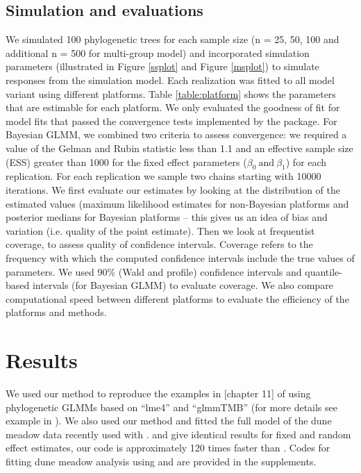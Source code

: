 \documentclass[12pt]{article}
\begin{document}
\subsection*{Simulation and evaluations}
We simulated 100 phylogenetic trees for each sample size (n = 25, 50, 100 and additional n = 500 for multi-group model) and incorporated simulation parameters (illustrated in Figure \ref{ssplot} and Figure \ref{msplot}) to simulate responses from the simulation model.
Each realization was fitted to all model variant using different platforms.
Table \ref{table:platform} shows the parameters that are estimable for each platform. 
We only evaluated the goodness of fit for model fits that passed the convergence tests implemented by the package.
For Bayesian GLMM, we combined two criteria to assess convergence: we required a value of the Gelman and Rubin statistic less than 1.1 and an effective sample size (ESS) greater than 1000 for the fixed effect parameters ($\beta_{0} \ \textrm{and} \ \beta_{1}$) for each replication. 
For each replication we sample two chains starting with 10000 iterations. 
We first evaluate our estimates by looking at the distribution of the estimated values (maximum likelihood estimates for non-Bayesian platforms and posterior medians for Bayesian platforms -- this gives us an idea of bias and variation (i.e. quality of the point estimate).
Then we look at frequentist coverage, to assess quality of confidence intervals.
Coverage refers to the frequency with which the computed confidence intervals include the true values of parameters.
We used 90\% (Wald and profile) confidence intervals and quantile-based intervals (for Bayesian GLMM) to evaluate coverage.
We also compare computational speed between different platforms to evaluate the efficiency of the platforms and methods. 

\section*{Results}

We used our method to reproduce the examples in [chapter 11] of \cite{garamszegi2014modern} using phylogenetic GLMMs based on ``lme4'' and ``glmmTMB'' (for more details see example in \cite{michael_li_2019_2639887}).
We also used our method and fitted the full model of the dune meadow data recently used with  \citep{li2017canfun}. 
 and  give identical results for fixed and random effect estimates, our code is approximately 120 times faster than . 
Codes for fitting dune meadow analysis using  and  are provided in the supplements. 
\end{document}
